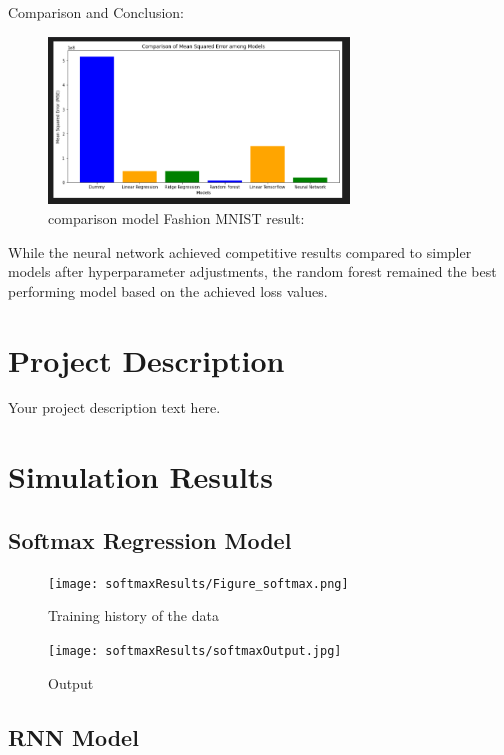 \documentclass{article}
\begin{document}
Comparison and Conclusion:
\begin{figure}[H]
    \caption{comparison model Fashion MNIST result:}
    \centering
    \includegraphics[width=8cm]{imgFolder/comparisonFlight.png}
\end{figure}
While the neural network achieved competitive results compared to simpler models after hyperparameter adjustments, the random forest remained the best performing model based on the achieved loss values.

\newpage
\section{Project Description}
Your project description text here.

\newpage
\section{Simulation Results}

\subsection{Softmax Regression Model}

\begin{figure}[h]
\caption{Training history of the data}
\centering
\texttt{[image: softmaxResults/Figure\_softmax.png]}
\end{figure}

\begin{figure}[h]
\caption{Output}
\centering
\texttt{[image: softmaxResults/softmaxOutput.jpg]}
\end{figure}

\subsection{RNN Model}

\end{document}
